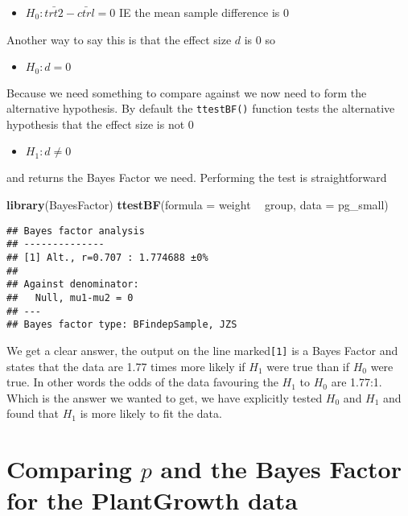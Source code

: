 \documentclass[
]{book}
\newenvironment{Shaded}{\begin{snugshade}}{\end{snugshade}}
\newcommand{\DataTypeTok}[1]{\textcolor[rgb]{0.13,0.29,0.53}{#1}}
\newcommand{\KeywordTok}[1]{\textcolor[rgb]{0.13,0.29,0.53}{\textbf{#1}}}
\newcommand{\NormalTok}[1]{#1}
\newcommand{\OperatorTok}[1]{\textcolor[rgb]{0.81,0.36,0.00}{\textbf{#1}}}
\newcommand{\StringTok}[1]{\textcolor[rgb]{0.31,0.60,0.02}{#1}}
\providecommand{\tightlist}{%
  \setlength{\itemsep}{0pt}\setlength{\parskip}{0pt}}
\begin{document}
\begin{itemize}
\tightlist
\item
  \(H_0 : \bar{trt2} - \bar{ctrl} = 0\) IE the mean sample difference is 0
\end{itemize}

Another way to say this is that the effect size \(d\) is 0 so

\begin{itemize}
\tightlist
\item
  \(H_0 : d = 0\)
\end{itemize}

Because we need something to compare against we now need to form the alternative hypothesis. By default the \texttt{ttestBF()} function tests the alternative hypothesis that the effect size is not 0

\begin{itemize}
\tightlist
\item
  \(H_1 : d \neq 0\)
\end{itemize}

and returns the Bayes Factor we need. Performing the test is straightforward

\begin{Shaded}
\begin{Highlighting}[]
\KeywordTok{library}\NormalTok{(BayesFactor)}
\KeywordTok{ttestBF}\NormalTok{(}\DataTypeTok{formula =}\NormalTok{  weight }\OperatorTok{~}\StringTok{ }\NormalTok{group, }\DataTypeTok{data =}\NormalTok{ pg_small)}
\end{Highlighting}
\end{Shaded}

\begin{verbatim}
## Bayes factor analysis
## --------------
## [1] Alt., r=0.707 : 1.774688 ±0%
## 
## Against denominator:
##   Null, mu1-mu2 = 0 
## ---
## Bayes factor type: BFindepSample, JZS
\end{verbatim}

We get a clear answer, the output on the line marked\texttt{{[}1{]}} is a Bayes Factor and states that the data are 1.77 times more likely if \(H_1\) were true than if \(H_0\) were true. In other words the odds of the data favouring the \(H_1\) to \(H_0\) are 1.77:1. Which is the answer we wanted to get, we have explicitly tested \(H_0\) and \(H_1\) and found that \(H_1\) is more likely to fit the data.

\hypertarget{comparing-p-and-the-bayes-factor-for-the-plantgrowth-data}{%
\section{\texorpdfstring{Comparing \(p\) and the Bayes Factor for the PlantGrowth data}{Comparing p and the Bayes Factor for the PlantGrowth data}}\label{comparing-p-and-the-bayes-factor-for-the-plantgrowth-data}}
\end{document}
